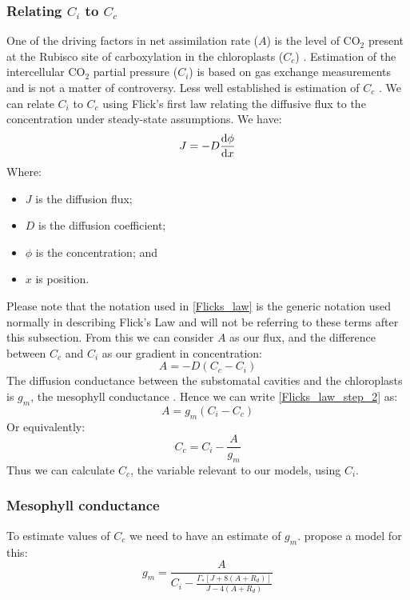 \documentclass[11pt]{article} %
\begin{document}
\subsubsection{Relating $C_i$ to $C_c$}
One of the driving factors in net assimilation rate ($A$) is the level of CO$_2$ present at the Rubisco site of carboxylation in the chloroplasts ($C_c$) \cite{VonCaemmererSteadystatemodelsphotosynthesis2013}. Estimation of the intercellular CO$_2$ partial pressure ($C_i$) is based on gas exchange measurements and is not a matter of controversy. Less well established is estimation of $C_c$ \cite{YinTheoreticalreconsiderationswhen2009}.  We can relate $C_i$ to $C_c$ using Flick's first law relating the diffusive flux to the concentration  under steady-state assumptions. We have:
\begin{equation} \label{Flicks_law}
J = -D\dv{\phi}{x}
\end{equation}
Where:
\begin{itemize}
 \item $J$ is the diffusion flux;
 \item $D$ is the diffusion coefficient;
 \item $\phi$ is the concentration; and
 \item $x$ is position.
\end{itemize}
Please note that the notation used in \eqref{Flicks_law} is the generic notation used normally in describing Flick's Law and will not be referring to these terms after this subsection. From this we can consider $A$ as our flux, and the difference between $C_c$ and $C_i$ as our gradient in concentration:
\begin{equation} \label{Flicks_law_step_2}
A = -D(C_c - C_i)
\end{equation}
The diffusion conductance between the substomatal cavities and the chloroplasts is $g_m$, the mesophyll conductance \cite{NiinemetsImportancemesophylldiffusion2009}. Hence we can write \eqref{Flicks_law_step_2} as:
\begin{equation} \label{Flicks_law_photosynthesis_form}
A = g_m(C_i - C_c)
\end{equation}
Or equivalently:
\begin{equation} \label{Ci_Cc_relationship}
C_c = C_i - \frac{A}{g_m}
\end{equation}
Thus we can calculate $C_c$, the variable relevant to our models, using $C_i$.

\subsubsection{Mesophyll conductance}
To estimate values of $C_c$ we need to have an estimate of $g_m$. \citet{HarleyTheoreticalConsiderationswhen1992a} propose a model for this:
\begin{equation} \label{eqn_g_m}
g_m = \frac{A}{C_i - \frac{\Gamma_* \left[J + 8 (A + R_d) \right]}{J - 4 (A + R_d)}}
\end{equation}
\end{document}
